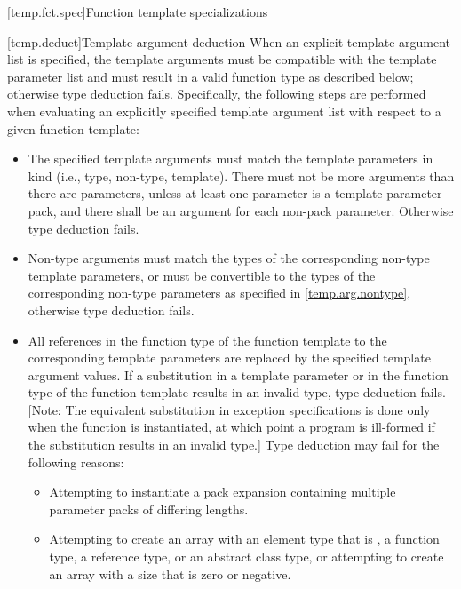 \documentclass[american]{book}
\begin{document}
\begin{paras}
[temp.fct.spec]{Function template specializations}

\setcounter{subsection}{1}
[temp.deduct]{Template argument deduction}
\setcounter{Paras}{1}
\pnum
When an explicit template argument list is specified, the template
arguments must be compatible with the template parameter list and must
result in a valid function type as described below; otherwise type
deduction fails.  Specifically, the following steps are performed when
evaluating an explicitly specified template argument list with respect
to a given function template:

\begin{itemize}
\item
The specified template arguments must match the template parameters in
kind (i.e., type, non-type, template). There must not be more
arguments than there are parameters, unless at least one parameter is
a template parameter pack, and there shall be an argument for each
non-pack parameter. Otherwise type deduction fails.
\item
Non-type arguments must match the types of the corresponding non-type
template parameters, or must be convertible to the types of the
corresponding non-type parameters as specified in
\ref{temp.arg.nontype}, otherwise type deduction fails.
\item
All references in the function type  of the function template to the
corresponding template parameters are replaced by the specified
template argument values.  If a substitution in a template
parameter
or in the function type of the function template results in an invalid
type, type deduction fails.  [Note: The equivalent substitution in
exception specifications is done only when the function is
instantiated, at which point a program is ill-formed if the
substitution results in an invalid type.] Type deduction may fail for
the following reasons:

\begin{itemize}
\item
Attempting to instantiate a pack expansion containing
multiple parameter packs of differing lengths.

\item
Attempting to create an array with an element type that is , a
function type, a reference type, or an abstract class type, or attempting
to create an array with a size that is zero or negative.
\enterexample\ 


\end{itemize}
\end{itemize}
\end{paras}
\end{document}
